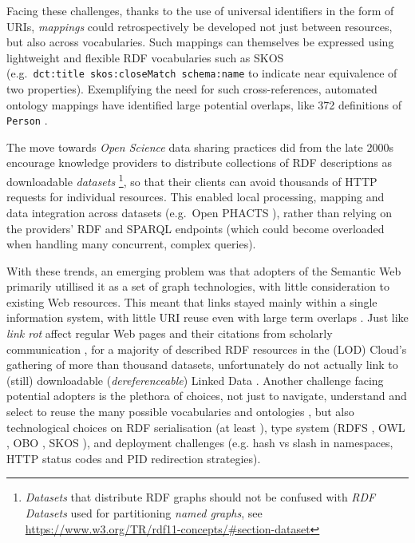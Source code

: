 Facing these challenges, thanks to the use of universal identifiers in the form of URIs, \emph{mappings} could retrospectively be developed not just between resources, but also across vocabularies. Such mappings can themselves be expressed using lightweight and flexible RDF vocabularies such as SKOS \cite{w3-skos-primer} (e.g.~\texttt{dct:title\ skos:closeMatch\ schema:name} to indicate near equivalence of two properties). Exemplifying the need for such cross-references, automated ontology mappings have identified large potential overlaps, like 372 definitions of \texttt{Person} \cite{huHowMatchableAre2011a}.


The move towards \emph{Open Science} data sharing practices did from the late 2000s encourage knowledge providers to distribute collections of RDF descriptions as downloadable \emph{datasets} \footnote{\emph{Datasets} that distribute RDF graphs should not be confused with \emph{RDF Datasets} used for partitioning \emph{named graphs}, see \url{https://www.w3.org/TR/rdf11-concepts/\#section-dataset}}, so that their clients can avoid thousands of HTTP requests for individual resources\label{ch20:avoid-lots-of-requests}. This enabled local processing, mapping and data integration across datasets (e.g.~Open PHACTS \cite{grothAPIcentricLinkedData2014b}), rather than relying on the providers' RDF and SPARQL endpoints (which could become overloaded when handling many concurrent, complex queries).

With these trends, an emerging problem was that adopters of the Semantic Web primarily utillised it as a set of graph technologies, with little consideration to existing Web resources. This meant that links stayed mainly within a single information system, with little URI reuse even with large term overlaps \cite{kamdarSystematicAnalysisTerm2017a}. Just like \emph{link rot} affect regular Web pages and their citations from scholarly communication \cite{kleinScholarlyContextNot2014a}, for a majority of described RDF resources in the  (LOD) Cloud's gathering of more than thousand datasets, unfortunately do not actually link to (still) downloadable (\emph{dereferenceable}) Linked Data \cite{polleresMoreDecentralizedVision2020a}. Another challenge facing potential adopters is the plethora of choices, not just to navigate, understand and select to reuse the many possible vocabularies and ontologies \cite{carrieroLandscapeOntologyReuse2020a}, but also technological choices on RDF serialisation (at least ), type system (RDFS \cite{w3-rdf-schema}, OWL \cite{w3-owl2-overview}, OBO \cite{tirmiziMappingOBOOWL2011a}, SKOS \cite{w3-skos-primer}), and deployment challenges \cite{sauermannCoolURIsSemantic2011} (e.g. hash vs slash in namespaces, HTTP status codes and PID redirection strategies).

